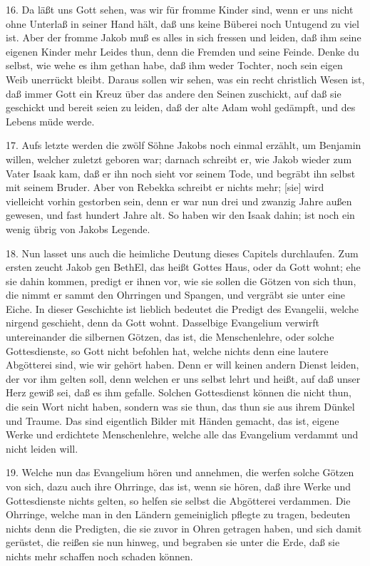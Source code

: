 16. Da läßt uns Gott sehen, was wir für fromme Kinder sind, wenn er uns nicht ohne Unterlaß in seiner Hand hält, daß uns keine Büberei noch Untugend zu viel ist. Aber der fromme Jakob muß es alles in sich fressen und leiden, daß ihm seine eigenen Kinder mehr Leides thun, denn die Fremden und seine Feinde. Denke du selbst, wie wehe es ihm gethan habe, daß ihm weder Tochter, noch sein eigen Weib unerrückt bleibt. Daraus sollen wir sehen, was ein recht christlich Wesen ist, daß immer Gott ein Kreuz über das andere den Seinen zuschickt, auf daß sie geschickt und bereit seien zu leiden, daß der alte Adam wohl gedämpft, und des Lebens müde werde.

17. Aufs letzte werden die zwölf Söhne Jakobs noch einmal erzählt, um Benjamin willen, welcher zuletzt geboren war; darnach schreibt er, wie Jakob wieder zum Vater Isaak kam, daß er ihn noch sieht vor seinem Tode, und begräbt ihn selbst mit seinem Bruder. Aber von Rebekka schreibt er nichts mehr; [sie] wird vielleicht vorhin gestorben sein, denn er war nun drei und zwanzig Jahre außen gewesen, und fast hundert Jahre alt. So haben wir den Isaak dahin; ist noch ein wenig übrig von Jakobs Legende.

18. Nun lasset uns auch die heimliche Deutung dieses Capitels durchlaufen. Zum ersten zeucht Jakob gen BethEl, das heißt Gottes Haus, oder da Gott wohnt; ehe sie dahin kommen, predigt er ihnen vor, wie sie sollen die Götzen von sich thun, die nimmt er sammt den Ohrringen und Spangen, und vergräbt sie unter eine Eiche. In dieser Geschichte ist lieblich bedeutet die Predigt des Evangelii, welche nirgend geschieht, denn da Gott wohnt. Dasselbige Evangelium verwirft untereinander die silbernen Götzen, das ist, die Menschenlehre, oder solche Gottesdienste, so Gott nicht befohlen hat, welche nichts denn eine lautere Abgötterei sind, wie wir gehört haben. Denn er will keinen andern Dienst leiden, der vor ihm gelten soll, denn welchen er uns selbst lehrt und heißt, auf daß unser Herz gewiß sei, daß es ihm gefalle. Solchen Gottesdienst können die nicht thun, die sein Wort nicht haben, sondern was sie thun, das thun sie aus ihrem Dünkel und Traume. Das sind eigentlich Bilder mit Händen gemacht, das ist, eigene Werke und erdichtete Menschenlehre, welche alle das Evangelium verdammt und nicht leiden will.

19. Welche nun das Evangelium hören und annehmen, die werfen solche Götzen von sich, dazu auch ihre Ohrringe, das ist, wenn sie hören, daß ihre Werke und Gottesdienste nichts gelten, so helfen sie selbst die Abgötterei verdammen. Die Ohrringe, welche man in den Ländern gemeiniglich pflegte zu tragen, bedeuten nichts denn die Predigten, die sie zuvor in Ohren getragen haben, und sich damit gerüstet, die reißen sie nun hinweg, und begraben sie unter die Erde, daß sie nichts mehr schaffen noch schaden können.

